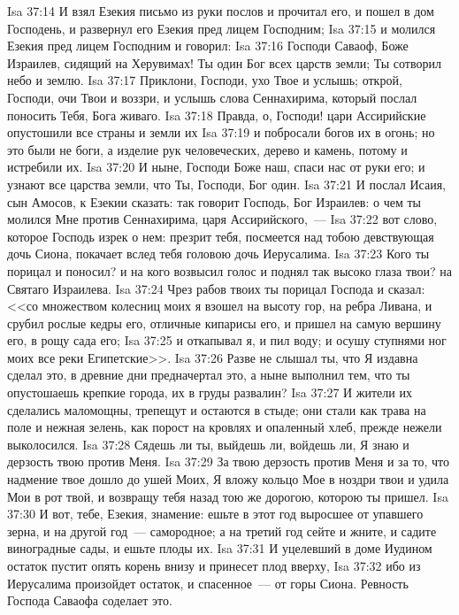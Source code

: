 \rsbpar\vs Isa 37:14 И взял Езекия письмо из руки послов и прочитал его, и пошел в дом Господень, и развернул его Езекия пред лицем Господним;
\vs Isa 37:15 и молился Езекия пред лицем Господним и говорил:
\vs Isa 37:16 Господи Саваоф, Боже Израилев, сидящий на Херувимах! Ты один Бог всех царств земли; Ты сотворил небо и землю.
\vs Isa 37:17 Приклони, Господи, ухо Твое и услышь; открой, Господи, очи Твои и воззри, и услышь слова Сеннахирима, который послал поносить Тебя, Бога живаго.
\vs Isa 37:18 Правда, о, Господи! цари Ассирийские опустошили все страны и земли их
\vs Isa 37:19 и побросали богов их в огонь; но это были не боги, а изделие рук человеческих, дерево и камень, потому и истребили их.
\vs Isa 37:20 И ныне, Господи Боже наш, спаси нас от руки его; и узнают все царства земли, что Ты, Господи, Бог один.
\rsbpar\vs Isa 37:21 И послал Исаия, сын Амосов, к Езекии сказать: так говорит Господь, Бог Израилев: о чем ты молился Мне против Сеннахирима, царя Ассирийского,~---
\vs Isa 37:22 вот слово, которое Господь изрек о нем: презрит тебя, посмеется над тобою девствующая дочь Сиона, покачает вслед тебя головою дочь Иерусалима.
\vs Isa 37:23 Кого ты порицал и поносил? и на кого возвысил голос и поднял так высоко глаза твои? на Святаго Израилева.
\vs Isa 37:24 Чрез рабов твоих ты порицал Господа и сказал: <<со множеством колесниц моих я взошел на высоту гор, на ребра Ливана, и срубил рослые кедры его, отличные кипарисы его, и пришел на самую вершину его, в рощу сада его;
\vs Isa 37:25 и откапывал я, и пил воду; и осушу ступнями ног моих все реки Египетские>>.
\vs Isa 37:26 Разве не слышал ты, что Я издавна сделал это, в древние дни предначертал это, а ныне выполнил тем, что ты опустошаешь крепкие города,  их в груды развалин?
\vs Isa 37:27 И жители их сделались маломощны, трепещут и остаются в стыде; они стали как трава на поле и нежная зелень, как порост на кровлях и опаленный хлеб, прежде нежели выколосился.
\vs Isa 37:28 Сядешь ли ты, выйдешь ли, войдешь ли, Я знаю  и дерзость твою против Меня.
\vs Isa 37:29 За твою дерзость против Меня и за то, что надмение твое дошло до ушей Моих, Я вложу кольцо Мое в ноздри твои и удила Мои в рот твой, и возвращу тебя назад тою же дорогою, которою ты пришел.
\vs Isa 37:30 И вот, тебе, Езекия, знамение: ешьте в этот год выросшее от упавшего зерна, и на другой год~--- самородное; а на третий год сейте и жните, и садите виноградные сады, и ешьте плоды их.
\vs Isa 37:31 И уцелевший в доме Иудином остаток пустит опять корень внизу и принесет плод вверху,
\vs Isa 37:32 ибо из Иерусалима произойдет остаток, и спасенное~--- от горы Сиона. Ревность Господа Саваофа соделает это.
